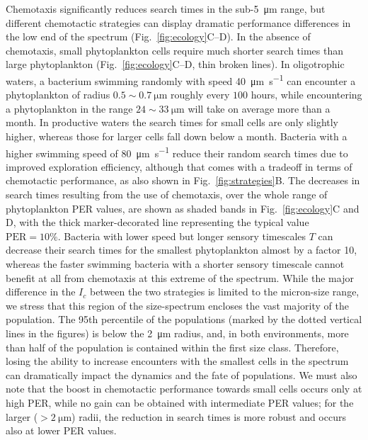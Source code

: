 \documentclass[9pt,twocolumn,twoside]{pnas-new}
\providecommand{\DIFadd}[1]{{\protect\color{blue}\uwave{#1}}} %
\providecommand{\DIFdel}[1]{{\protect\color{red}\sout{#1}}}                      %
\providecommand{\DIFaddbegin}{} %
\providecommand{\DIFaddend}{} %
\providecommand{\DIFdelbegin}{} %
\providecommand{\DIFdelend}{} %
\begin{document}
Chemotaxis significantly reduces search times in the sub-\SI{5}{\micro\m} range, but different chemotactic strategies can display dramatic performance differences in the low end of the spectrum (Fig.~\ref{fig:ecology}C--D).
In the absence of chemotaxis, small phytoplankton cells require much shorter search times than large phytoplankton (Fig.~\ref{fig:ecology}C--D, thin broken lines).
In oligotrophic waters, a bacterium swimming randomly with speed \SI{40}{\micro\m\per\s} can encounter a phytoplankton of radius $0.5\sim\SI{0.7}{\micro\m}$ roughly every $100$ hours, while encountering a phytoplankton in the range \DIFdelbegin \DIFdel{$24\sim\SI{33}{\micro\m}$ }\DIFdelend \DIFaddbegin \DIFadd{$24\text{---}\SI{33}{\micro\m}$ }\DIFaddend will take on average more than a month. 
%
In productive waters the search times for small cells are only slightly higher, whereas those for larger cells fall down below a month. Bacteria with a higher swimming speed of \SI{80}{\micro\m\per\s} reduce their random search times due to improved exploration efficiency, although that comes with a tradeoff in terms of chemotactic performance, as also shown in Fig.~\ref{fig:strategies}B.
The decreases in search times resulting from the use of chemotaxis, over the whole range of phytoplankton PER values, are shown as shaded bands in Fig.~\ref{fig:ecology}C and D, with the thick marker-decorated line representing the typical value $\mathrm{PER}=10\%$.
Bacteria with lower speed but longer sensory timescales $T$ can decrease their search times for the smallest phytoplankton almost by a factor 10, whereas the faster swimming bacteria with a shorter sensory timescale cannot benefit at all from chemotaxis at this extreme of the spectrum.
While the major difference in the $I_c$ between the two strategies is limited to the micron-size range, we stress that this region of the size-spectrum encloses the vast majority of the population.
The 95th percentile of the populations (marked by the dotted vertical lines in the figures) is below the \SI{2}{\micro\m} radius, and, in both environments, more than half of the population is contained within the first size class.
Therefore, losing the ability to increase encounters with the smallest cells in the spectrum can dramatically impact the dynamics and the fate of populations.
We must also note that the boost in chemotactic performance towards small cells occurs only at high PER, while no gain can be obtained with intermediate PER values; for the larger ($>\SI{2}{\micro\m}$) radii, the reduction in search times is more robust and occurs also at lower PER values.
\end{document}
